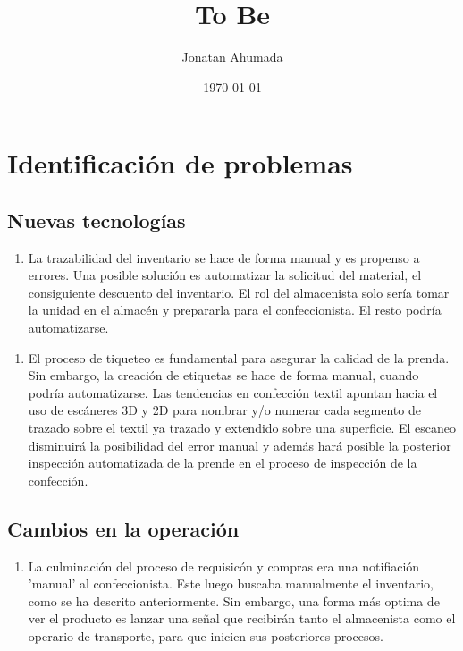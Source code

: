 \documentclass[11pt]{article}
\author{Jonatan Ahumada}
\date{\today}
\title{To Be}
\begin{document}
\maketitle
\tableofcontents


\section{Identificación de problemas}
\label{sec:orgeff15b6}

\subsection{Nuevas tecnologías}
\label{sec:orgdc8bc20}

\begin{enumerate}
\item La trazabilidad del inventario se hace de forma manual y es propenso
a errores. Una posible solución es automatizar la solicitud del material,
el consiguiente descuento del inventario. El rol del almacenista solo sería
tomar la unidad en el almacén y prepararla para el confeccionista. El
resto podría automatizarse.

\end{enumerate}

\begin{enumerate}
\item El proceso de tiqueteo es fundamental para asegurar la calidad de la
prenda. Sin embargo, la creación de etiquetas se hace de forma manual,
cuando podría automatizarse. Las tendencias en confección textil
apuntan hacia el uso de escáneres 3D y 2D para nombrar y/o numerar
cada segmento de trazado sobre el textil ya trazado y extendido
sobre una superficie. El escaneo disminuirá la posibilidad del
error manual y además hará posible la posterior inspección automatizada
de la prende en el proceso de inspección de la confección.
\end{enumerate}


\subsection{Cambios en la operación}
\label{sec:org1d647b7}

\begin{enumerate}
\item La culminación del proceso de requisicón y compras era una notifiación
'manual' al confeccionista. Este luego buscaba manualmente el inventario,
como se ha descrito anteriormente. Sin embargo, una forma más optima de ver
el producto es lanzar una señal que recibirán tanto el almacenista
como el operario de transporte, para que inicien sus posteriores procesos.
\end{enumerate}
\end{document}
